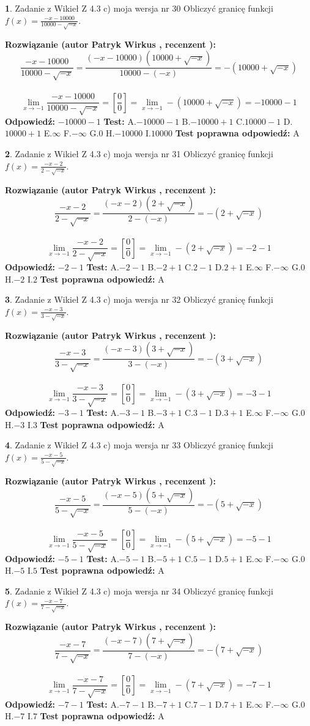 \documentclass[12pt, a4paper]{article}
\theoremstyle{definition} %
\newtheorem{zad}{}
\newcommand{\zadStart}[1]{\begin{zad}#1\newline}
\newcommand{\zadStop}{\end{zad}}
\newcommand{\rozwStart}[2]{\noindent \textbf{Rozwiązanie (autor #1 , recenzent #2): }\newline}
\newcommand{\rozwStop}{\newline}
\newcommand{\odpStart}{\noindent \textbf{Odpowiedź:}\newline}
\newcommand{\odpStop}{\newline}
\newcommand{\testStart}{\noindent \textbf{Test:}\newline}
\newcommand{\testStop}{\newline}
\newcommand{\kluczStart}{\noindent \textbf{Test poprawna odpowiedź:}\newline}
\newcommand{\kluczStop}{\newline}
\begin{document}
\zadStart{Zadanie z Wikieł Z 4.3 c) moja wersja nr 30}
Obliczyć granicę funkcji $f(x)=\frac{-x-10000}{10000-\sqrt{-x}}$.
\zadStop
\rozwStart{Patryk Wirkus}{}
$$\frac{-x-10000}{10000-\sqrt{-x}}=\frac{(-x-10000)(10000+\sqrt{-x})}{10000-(-x)}=-(10000+\sqrt{-x})$$
\\
$$\lim\limits_{x\to-1}\frac{-x-10000}{10000-\sqrt{-x}}=[\frac{0}{0}]=\lim\limits_{x\to-1}-(10000+\sqrt{-x}) =-10000-1$$
\rozwStop
\odpStart
$-10000-1$
\odpStop
\testStart
A.$-10000-1$
B.$-10000+1$
C.$10000-1$
D.$10000+1$
E.$\infty$
F.$-\infty$
G.$0$
H.$-10000$
I.$10000$
\testStop
\kluczStart
A
\kluczStop



\zadStart{Zadanie z Wikieł Z 4.3 c) moja wersja nr 31}
Obliczyć granicę funkcji $f(x)=\frac{-x-2}{2-\sqrt{-x}}$.
\zadStop
\rozwStart{Patryk Wirkus}{}
$$\frac{-x-2}{2-\sqrt{-x}}=\frac{(-x-2)(2+\sqrt{-x})}{2-(-x)}=-(2+\sqrt{-x})$$
\\
$$\lim\limits_{x\to-1}\frac{-x-2}{2-\sqrt{-x}}=[\frac{0}{0}]=\lim\limits_{x\to-1}-(2+\sqrt{-x}) =-2-1$$
\rozwStop
\odpStart
$-2-1$
\odpStop
\testStart
A.$-2-1$
B.$-2+1$
C.$2-1$
D.$2+1$
E.$\infty$
F.$-\infty$
G.$0$
H.$-2$
I.$2$
\testStop
\kluczStart
A
\kluczStop



\zadStart{Zadanie z Wikieł Z 4.3 c) moja wersja nr 32}
Obliczyć granicę funkcji $f(x)=\frac{-x-3}{3-\sqrt{-x}}$.
\zadStop
\rozwStart{Patryk Wirkus}{}
$$\frac{-x-3}{3-\sqrt{-x}}=\frac{(-x-3)(3+\sqrt{-x})}{3-(-x)}=-(3+\sqrt{-x})$$
\\
$$\lim\limits_{x\to-1}\frac{-x-3}{3-\sqrt{-x}}=[\frac{0}{0}]=\lim\limits_{x\to-1}-(3+\sqrt{-x}) =-3-1$$
\rozwStop
\odpStart
$-3-1$
\odpStop
\testStart
A.$-3-1$
B.$-3+1$
C.$3-1$
D.$3+1$
E.$\infty$
F.$-\infty$
G.$0$
H.$-3$
I.$3$
\testStop
\kluczStart
A
\kluczStop



\zadStart{Zadanie z Wikieł Z 4.3 c) moja wersja nr 33}
Obliczyć granicę funkcji $f(x)=\frac{-x-5}{5-\sqrt{-x}}$.
\zadStop
\rozwStart{Patryk Wirkus}{}
$$\frac{-x-5}{5-\sqrt{-x}}=\frac{(-x-5)(5+\sqrt{-x})}{5-(-x)}=-(5+\sqrt{-x})$$
\\
$$\lim\limits_{x\to-1}\frac{-x-5}{5-\sqrt{-x}}=[\frac{0}{0}]=\lim\limits_{x\to-1}-(5+\sqrt{-x}) =-5-1$$
\rozwStop
\odpStart
$-5-1$
\odpStop
\testStart
A.$-5-1$
B.$-5+1$
C.$5-1$
D.$5+1$
E.$\infty$
F.$-\infty$
G.$0$
H.$-5$
I.$5$
\testStop
\kluczStart
A
\kluczStop



\zadStart{Zadanie z Wikieł Z 4.3 c) moja wersja nr 34}
Obliczyć granicę funkcji $f(x)=\frac{-x-7}{7-\sqrt{-x}}$.
\zadStop
\rozwStart{Patryk Wirkus}{}
$$\frac{-x-7}{7-\sqrt{-x}}=\frac{(-x-7)(7+\sqrt{-x})}{7-(-x)}=-(7+\sqrt{-x})$$
\\
$$\lim\limits_{x\to-1}\frac{-x-7}{7-\sqrt{-x}}=[\frac{0}{0}]=\lim\limits_{x\to-1}-(7+\sqrt{-x}) =-7-1$$
\rozwStop
\odpStart
$-7-1$
\odpStop
\testStart
A.$-7-1$
B.$-7+1$
C.$7-1$
D.$7+1$
E.$\infty$
F.$-\infty$
G.$0$
H.$-7$
I.$7$
\testStop
\kluczStart
A
\kluczStop
\end{document}
